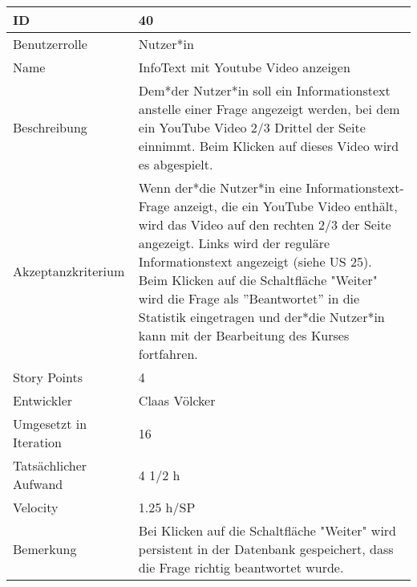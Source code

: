 \begin{tabularx}{\textwidth}{|p{}|X|}
	\hline
	ID & 40\\
	\hline
	Benutzerrolle & Nutzer*in\\
	\hline
	Name & InfoText mit Youtube Video anzeigen\\
	\hline
	Beschreibung & Dem*der Nutzer*in soll ein Informationstext anstelle einer Frage angezeigt werden, bei dem ein YouTube Video 2/3 Drittel der Seite einnimmt. Beim Klicken auf dieses Video wird es abgespielt.\\
	\hline
	Akzeptanzkriterium & Wenn der*die Nutzer*in eine Informationstext-Frage anzeigt, die ein YouTube Video enthält, wird das Video auf den rechten 2/3 der Seite angezeigt. Links wird der reguläre Informationstext angezeigt (siehe US 25). Beim Klicken auf die Schaltfläche "Weiter" wird die Frage als ''Beantwortet'' in die Statistik eingetragen und der*die Nutzer*in kann mit der Bearbeitung des Kurses fortfahren.\\
	\hline
	Story Points & 4\\
	\hline
	Entwickler & Claas Völcker\\
	\hline
	Umgesetzt in Iteration & 16\\
	\hline
	Tatsächlicher Aufwand & 4 1/2 h\\
	\hline
	Velocity & 1.25 h/SP\\
	\hline
	Bemerkung & Bei Klicken auf die Schaltfläche "Weiter" wird persistent in der Datenbank gespeichert, dass die Frage richtig beantwortet wurde.\\
	\hline
\end{tabularx}
\vspace{20pt}
